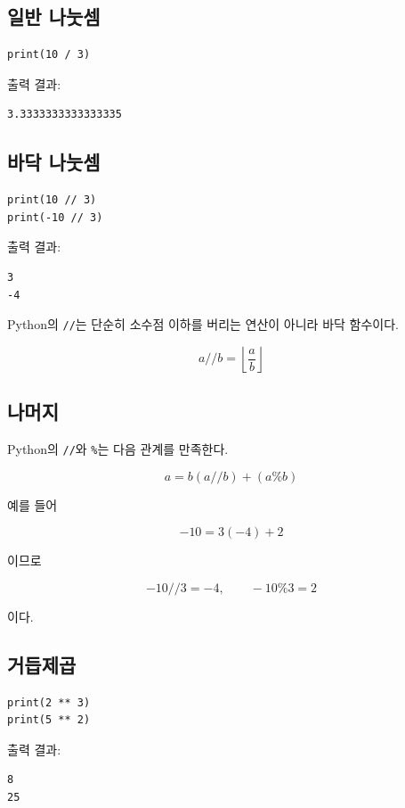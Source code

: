 \documentclass[11pt,a4paper]{article}
\begin{document}
\subsection{일반 나눗셈}

\begin{lstlisting}
print(10 / 3)
\end{lstlisting}

출력 결과:

\begin{verbatim}
3.3333333333333335
\end{verbatim}

\subsection{바닥 나눗셈}

\begin{lstlisting}
print(10 // 3)
print(-10 // 3)
\end{lstlisting}

출력 결과:

\begin{verbatim}
3
-4
\end{verbatim}

Python의 \texttt{//}는 단순히 소수점 이하를 버리는 연산이 아니라 바닥 함수이다.

\[
a//b=\left\lfloor\frac{a}{b}\right\rfloor
\]

\subsection{나머지}

Python의 \texttt{//}와 \texttt{\%}는 다음 관계를 만족한다.

\[
a=b(a//b)+(a\%b)
\]

예를 들어

\[
-10=3(-4)+2
\]

이므로

\[
-10//3=-4,\qquad -10\%3=2
\]

이다.

\subsection{거듭제곱}

\begin{lstlisting}
print(2 ** 3)
print(5 ** 2)
\end{lstlisting}

출력 결과:

\begin{verbatim}
8
25
\end{verbatim}
\end{document}
